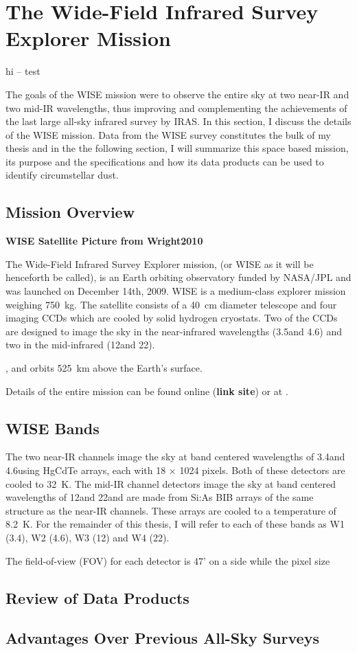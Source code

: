 \section{The Wide-Field Infrared Survey Explorer Mission}

hi -- test

    The goals of the WISE mission were to observe the entire sky at two near-IR and two mid-IR wavelengths, thus improving and complementing the achievements of the last large all-sky infrared survey by IRAS. In this section, I discuss the details of the WISE mission. Data from the WISE survey constitutes the bulk of my thesis and in the the following section, I will summarize this space based mission, its purpose and the specifications and how its data products can be used to identify circumstellar dust.
   

\subsection{Mission Overview}\label{sec:wise_overview}

\textbf{WISE Satellite Picture from Wright2010\label{fig:wise_sat}}

    The Wide-Field Infrared Survey Explorer mission, (or WISE as it will be henceforth be called), is an Earth orbiting observatory funded by NASA/JPL and was launched on December 14th, 2009. WISE is a medium-class explorer mission weighing 750~kg. The satellite consists of a 40~cm diameter telescope and four imaging CCDs which are cooled by solid hydrogen cryostats. Two of the CCDs are designed to image the sky in the near-infrared wavelengths (3.5\micron and 4.6\micron) and two in the mid-infrared (12\micron and 22\micron).
    
    
    , and orbits 525~km above the Earth's surface.
    
    
    Details of the entire mission can be found online (\textbf{link site}) or at \citep{Wright2010}. 

    
   
   
\subsection{WISE Bands}\label{sec:wise_bands}
   
   
   The two near-IR channels image the sky at band centered wavelengths of 3.4\micron and 4.6\micron using HgCdTe arrays, each with 18 $\times$ 1024 pixels. Both of these detectors are cooled to 32~K. The mid-IR channel detectors image the sky at band centered wavelengths of 12\micron and 22\micron and are made from Si:As BIB arrays of the same structure as the near-IR channels. These arrays are cooled to a temperature of 8.2~K. For the remainder of this thesis, I will refer to each of these bands as W1 (3.4\micron), W2 (4.6\micron), W3 (12\micron) and W4 (22\micron). 
   
   The field-of-view (FOV) for each detector is 47' on a side while the pixel size 


\subsection{Review of Data Products}


\subsection{Advantages Over Previous All-Sky Surveys}